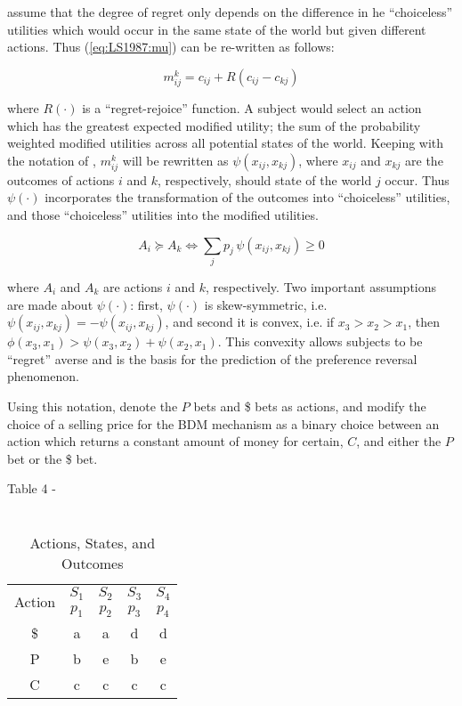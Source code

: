 \documentclass[../main.tex]{subfiles}
\begin{document}
\textcite[809]{Loomes1987} assume that the degree of regret only depends on the difference in  he \enquote{choiceless} utilities which would occur in the same state of the world but given different actions.
Thus (\ref{eq:LS1987:mu}) can be re-written as follows:

\begin{equation}
	\label{eq:LS1987:mu2}
	m^k_{ij} = c_{ij} + R(c_{ij} - c_{kj})
\end{equation}

\noindent where $R(\cdot)$ is a \enquote{regret-rejoice} function. 
A subject would select an action which has the greatest expected modified utility; the sum of the probability weighted modified utilities across all potential states of the world.
Keeping with the notation of \textcite{Loomes1989}, $m^k_{ij}$ will be rewritten as $\psi(x_{ij}, x_{kj})$, where $x_{ij}$ and $x_{kj}$ are the outcomes of actions $i$ and $k$, respectively, should state of the world $j$ occur.
Thus $\psi(\cdot)$ incorporates the transformation of the outcomes into \enquote{choiceless} utilities, and those \enquote{choiceless} utilities into the modified utilities.

\begin{equation}
	\label{eq:LSS1989:mu3}
	A_i \succcurlyeq  A_k \Leftrightarrow \sum_{j} p_j \, \psi ( x_{ij} , x_{kj} ) \geq  0
\end{equation}

\noindent where $A_i$ and $A_k$ are actions $i$ and $k$, respectively.
Two important assumptions are made about $\psi(\cdot)$: first, $\psi(\cdot)$ is skew-symmetric, i.e. $\psi(x_{ij},x_{kj}) = -\psi(x_{ij},x_{kj})$, and second it is convex, i.e. if $x_3 > x_2 > x_1$, then $\phi(x_3,x_1) > \psi(x_3,x_2) + \psi(x_2,x_1)$.
This convexity allows subjects to be \enquote{regret} averse and is the basis for the prediction of the preference reversal phenomenon.

Using this notation, \textcite{Loomes1989} denote the $P$ bets and \$ bets as actions, and modify the choice of a selling price for the BDM mechanism as a binary choice between an action which returns a constant amount of money for certain, $C$, and either the $P$ bet or the \$ bet.

Table 4 -  \textcite{Loomes1989}
\begin{table}[ht]
	\centering
	\caption{ \textcite{Loomes1989} \\ Actions, States, and Outcomes }
	\label{tb:LSS1989:ASO}
	\begin{tabular}{ccccc}
		\multirow{2}{*}{Action} & $S_1$ & $S_2$ & $S_3$ & $S_4$ \\[-.75em]
		                        & $p_1$ & $p_2$ & $p_3$ & $p_4$ \\\hline
		                    \$  &   a   &   a   &   d   &   d   \\
		                    P   &   b   &   e   &   b   &   e   \\
		                    C   &   c   &   c   &   c   &   c   
	\end{tabular}
\end{table}
\end{document}
